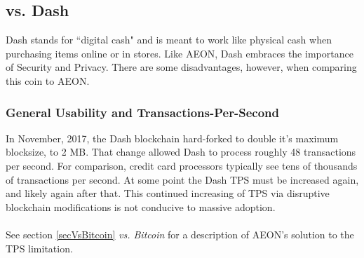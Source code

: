 \subsection{vs. Dash}
Dash stands for “digital cash" and is meant to work like physical cash when purchasing items online or in stores.  Like AEON, Dash embraces the importance of Security and Privacy.  There are some disadvantages, however, when comparing this coin to AEON.

\subsubsection{General Usability and Transactions-Per-Second}
In November, 2017, the Dash blockchain hard-forked to double it's maximum blocksize, to 2 MB. That change allowed Dash to process roughly 48 transactions per second.  For comparison, credit card processors typically see tens of thousands of transactions per second.  At some point the Dash TPS must be increased again, and likely again after that.  This continued increasing of TPS via disruptive blockchain modifications is not conducive to massive adoption.\\
\\
See section \ref{secVsBitcoin} \textit{vs. Bitcoin} for a description of AEON's solution to the TPS limitation.

